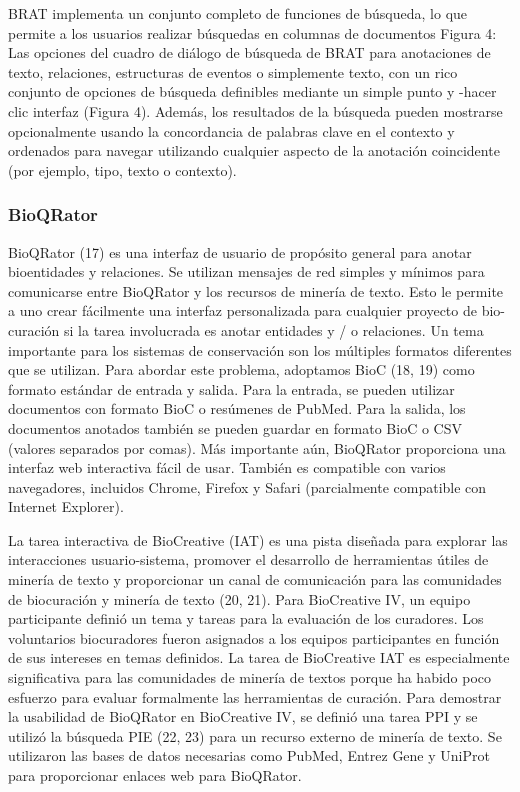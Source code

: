 BRAT implementa un conjunto completo de funciones de búsqueda, lo que permite a los usuarios realizar búsquedas en columnas de documentos Figura 4: Las opciones del cuadro de diálogo de búsqueda de BRAT para anotaciones de texto, relaciones, estructuras de eventos o simplemente texto, con un rico conjunto de opciones de búsqueda definibles mediante un simple punto y -hacer clic
interfaz (Figura 4). Además, los resultados de la búsqueda pueden mostrarse opcionalmente usando la concordancia de palabras clave en el contexto y ordenados para navegar
utilizando cualquier aspecto de la anotación coincidente (por ejemplo, tipo, texto o contexto).

\subsubsection*{BioQRator}

BioQRator (17) es una interfaz de usuario de propósito general para anotar bioentidades y relaciones. Se utilizan mensajes de red simples y mínimos para comunicarse entre BioQRator y los recursos de minería de texto. Esto le permite a uno crear fácilmente una interfaz personalizada para cualquier proyecto de bio-curación si la tarea involucrada es anotar entidades y / o relaciones. Un tema importante para los sistemas de conservación son los múltiples formatos diferentes que se utilizan. Para abordar este problema, adoptamos BioC (18, 19) como formato estándar de entrada y salida. Para la entrada, se pueden utilizar documentos con formato BioC o resúmenes de PubMed. Para la salida, los documentos anotados también se pueden guardar en formato BioC o CSV (valores separados por comas). Más importante aún, BioQRator proporciona una interfaz web interactiva fácil de usar. También es compatible con varios navegadores, incluidos Chrome, Firefox y Safari (parcialmente compatible con Internet Explorer).

La tarea interactiva de BioCreative (IAT) es una pista diseñada para explorar las interacciones usuario-sistema, promover el desarrollo de herramientas útiles de minería de texto y proporcionar un canal de comunicación para las comunidades de biocuración y minería de texto (20, 21). Para BioCreative IV, un equipo participante definió un tema y tareas para la evaluación de los curadores. Los voluntarios biocuradores fueron asignados a los equipos participantes en función de sus intereses en temas definidos. La tarea de BioCreative IAT es especialmente significativa para las comunidades de minería de textos porque ha habido poco esfuerzo para evaluar formalmente las herramientas de curación. Para demostrar la usabilidad de BioQRator en BioCreative IV, se definió una tarea PPI y se utilizó la búsqueda PIE (22, 23) para un recurso externo de minería de texto. Se utilizaron las bases de datos necesarias como PubMed, Entrez Gene y UniProt para proporcionar enlaces web para BioQRator.


